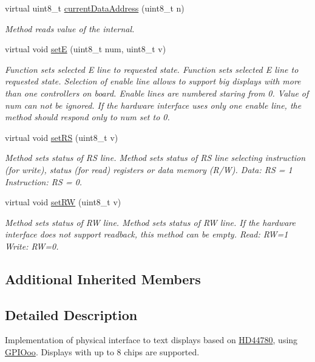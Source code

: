 \begin{DoxyCompactItemize}
virtual uint8\-\_\-t \hyperlink{class_h_d44780gpio_phy_a933e313ac7a5362b6a55a3db9af337a3}{current\-Data\-Address} (uint8\-\_\-t n)
\begin{DoxyCompactList}\small\item\em Method reads value of the internal. \end{DoxyCompactList}\item 
virtual void \hyperlink{class_h_d44780gpio_phy_a58958f3a1c2e702da568aac6c4c8c32f}{set\-E} (uint8\-\_\-t num, uint8\-\_\-t v)
\begin{DoxyCompactList}\small\item\em Function sets selected E line to requested state. Function sets selected E line to requested state. Selection of enable line allows to support big displays with more than one controllers on board. Enable lines are numbered staring from 0. Value of {\itshape num} can not be ignored. If the hardware interface uses only one enable line, the method should respond only to num set to 0. \end{DoxyCompactList}\item 
virtual void \hyperlink{class_h_d44780gpio_phy_ae396a22b3a46bd163a4b65b1eeb007af}{set\-R\-S} (uint8\-\_\-t v)
\begin{DoxyCompactList}\small\item\em Method sets status of R\-S line. Method sets status of R\-S line selecting instruction (for write), status (for read) registers or data memory (R/\-W). Data\-: R\-S = 1 Instruction\-: R\-S = 0. \end{DoxyCompactList}\item 
virtual void \hyperlink{class_h_d44780gpio_phy_a5465139b8680c044b1ef1a040027f2d3}{set\-R\-W} (uint8\-\_\-t v)
\begin{DoxyCompactList}\small\item\em Method sets status of R\-W line. Method sets status of R\-W line. If the hardware interface does not support readback, this method can be empty. Read\-: R\-W=1 Write\-: R\-W=0. \end{DoxyCompactList}\end{DoxyCompactItemize}
\subsection*{Additional Inherited Members}


\subsection{Detailed Description}
Implementation of physical interface to text displays based on \hyperlink{class_h_d44780}{H\-D44780}, using \hyperlink{class_g_p_i_ooo}{G\-P\-I\-Ooo}. Displays with up to 8 chips are supported. 

